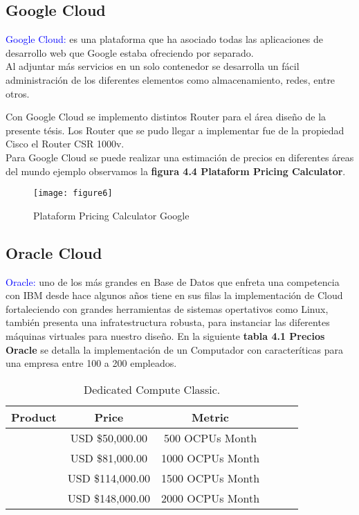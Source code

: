 \subsection{Google Cloud}

\textcolor{blue}{Google Cloud:} es una plataforma que ha asociado todas las aplicaciones de desarrollo web que Google 
estaba ofreciendo por separado.
\\
Al adjuntar más servicios en un solo contenedor se desarrolla un fácil administración de los diferentes elementos como almacenamiento, redes, entre otros.

Con Google Cloud se implemento distintos Router para el área diseño de la presente tésis. Los Router que se pudo llegar a implementar fue de la propiedad Cisco el Router CSR 1000v.
\\
Para Google Cloud se puede realizar una estimación de precios en diferentes áreas del mundo ejemplo observamos la \textbf{figura 4.4 Plataform Pricing Calculator}.

\begin{figure}[htbp]
  \centering
  {\texttt{[image: figure6]}}%
  \caption{Plataform Pricing Calculator Google}
  \label{fig:fig2subfig}
\end{figure}

\subsection{Oracle Cloud}

\textcolor{blue}{Oracle:} uno de los más grandes en Base de Datos que enfreta una competencia con IBM desde hace algunos años tiene en sus filas la implementación de Cloud fortaleciendo con grandes herramientas de sistemas opertativos como Linux, también presenta una infratestructura robusta, para instanciar las diferentes máquinas virtuales para nuestro diseño. En la siguiente \textbf{tabla 4.1 Precios Oracle} se detalla la implementación de un Computador con caracteríticas para una empresa entre 100 a 200 empleados.

\begin{table}[ht]
	\caption{Dedicated Compute Classic.}
	\label{tab:hla:results}
\centering
\begin{tabular}{lccccc}
	\toprule
	\multicolumn{1}{c}{\textbf{Product}} 	& \textbf{Price} & \textbf{Metric}\\
	\midrule
\cite{Compute Classic - Model 500} 		& USD \$50,000.00 & 500 OCPUs Month\\
\cite{Compute Classic - Model 1000} 		& USD \$81,000.00 & 1000 OCPUs Month\\
\cite{Compute Classic - Model 1500} 		& USD \$114,000.00 & 1500 OCPUs Month\\
\cite{Compute Classic - Model 2000} 		& USD \$148,000.00 & 2000 OCPUs Month\\

	\midrule
	\bottomrule
\end{tabular}
\end{table}

